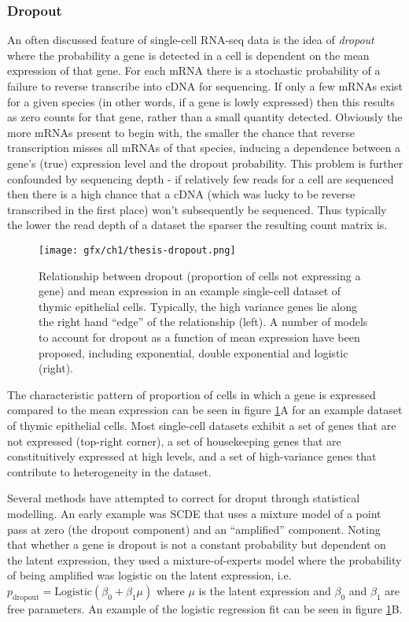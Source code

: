\subsubsection{Dropout}

An often discussed feature of single-cell RNA-seq data is the idea of \emph{dropout} where the probability a gene is detected in a cell is dependent on the mean expression of that gene. For each mRNA there is a stochastic probability of a failure to reverse transcribe into cDNA for sequencing. If only a few mRNAs exist for a given species (in other words, if a gene is lowly expressed) then this results as zero counts for that gene, rather than a small quantity detected. Obviously the more mRNAs present to begin with, the smaller the chance that reverse transcription misses all mRNAs of that species, inducing a dependence between a gene's (true) expression level and the dropout probability. This problem is further confounded by sequencing depth - if relatively few reads for a cell are sequenced then there is a high chance that a cDNA (which was lucky to be reverse transcribed in the first place) won't subsequently be sequenced. Thus typically the lower the read depth of a dataset the sparser the resulting count matrix is.

\begin{figure}
\centering
  \texttt{[image: gfx/ch1/thesis-dropout.png]}
  \caption{Relationship between dropout (proportion of cells not expressing a gene) and mean expression in an example single-cell dataset of thymic epithelial cells. Typically, the high variance genes lie along the right hand ``edge'' of the relationship (left). A number of models to account for dropout as a function of mean expression have been proposed, including exponential, double exponential and logistic (right).} \label{fig:intro_dropout}
\end{figure}

The characteristic pattern of proportion of cells in which a gene is expressed compared to the mean expression can be seen in figure \ref{fig:intro_dropout}A for an example dataset of thymic epithelial cells. Most single-cell datasets exhibit a set of genes that are not expressed (top-right corner), a set of housekeeping genes that are constituitively expressed at high levels, and a set of high-variance genes that contribute to heterogeneity in the dataset.

Several methods have attempted to correct for droput through statistical modelling. An early example was SCDE \cite{kharchenko2014bayesian} that uses a mixture model of a point pass at zero (the dropout component) and an ``amplified'' component. Noting that whether a gene is dropout is not a constant probability but dependent on the latent expression, they used a mixture-of-experts model where the probability of being amplified was logistic on the latent expression, i.e. $p_{\text{dropout}} = \text{Logistic}(\beta_0 + \beta_1 \mu)$ where $\mu$ is the latent expression and $\beta_0$ and $\beta_1$ are free parameters. An example of the logistic regression fit can be seen in figure \ref{fig:intro_dropout}B.

